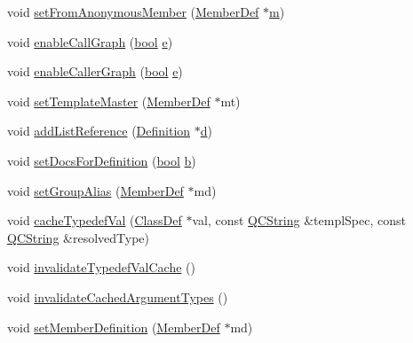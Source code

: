 \begin{DoxyCompactItemize}
\item 
void \hyperlink{class_member_def_aafa5f4cbcf4725cedc9ade6c18846454}{set\+From\+Anonymous\+Member} (\hyperlink{class_member_def}{Member\+Def} $\ast$\hyperlink{060__command__switch_8tcl_a78d127e8bda64d4471ac811ad512fbd9}{m})
\item 
void \hyperlink{class_member_def_ab47df482582383584ba4317a78b0f9a4}{enable\+Call\+Graph} (\hyperlink{qglobal_8h_a1062901a7428fdd9c7f180f5e01ea056}{bool} \hyperlink{060__command__switch_8tcl_aff65a51a703804e0ad1adbcfd76c86f8}{e})
\item 
void \hyperlink{class_member_def_a2636eed17da2f4fbb5e21e539429057c}{enable\+Caller\+Graph} (\hyperlink{qglobal_8h_a1062901a7428fdd9c7f180f5e01ea056}{bool} \hyperlink{060__command__switch_8tcl_aff65a51a703804e0ad1adbcfd76c86f8}{e})
\item 
void \hyperlink{class_member_def_a329e8f937a85c720897c571c48eec2eb}{set\+Template\+Master} (\hyperlink{class_member_def}{Member\+Def} $\ast$mt)
\item 
void \hyperlink{class_member_def_a6e41c3e69f5dbd82a5f52e384993b4a3}{add\+List\+Reference} (\hyperlink{class_definition}{Definition} $\ast$\hyperlink{060__command__switch_8tcl_af43f4b1f0064a33b2d662af9f06d3a00}{d})
\item 
void \hyperlink{class_member_def_a6af8024c45cb6bf279dec24f9be43ff7}{set\+Docs\+For\+Definition} (\hyperlink{qglobal_8h_a1062901a7428fdd9c7f180f5e01ea056}{bool} \hyperlink{060__command__switch_8tcl_a68bdb74c144118d936931c46f75d4b3e}{b})
\item 
void \hyperlink{class_member_def_ac3303d13571e2eaf0c19e2d86d101ef2}{set\+Group\+Alias} (\hyperlink{class_member_def}{Member\+Def} $\ast$md)
\item 
void \hyperlink{class_member_def_a828b5a44411f89b7cad45a1f20ff1bd7}{cache\+Typedef\+Val} (\hyperlink{class_class_def}{Class\+Def} $\ast$val, const \hyperlink{class_q_c_string}{Q\+C\+String} \&templ\+Spec, const \hyperlink{class_q_c_string}{Q\+C\+String} \&resolved\+Type)
\item 
void \hyperlink{class_member_def_a9dbccfff3e6e5f29d892c351641e0c3e}{invalidate\+Typedef\+Val\+Cache} ()
\item 
void \hyperlink{class_member_def_a52975bd460c0417b348eee2f569e8230}{invalidate\+Cached\+Argument\+Types} ()
\item 
void \hyperlink{class_member_def_abe245c356b9476451713c813578c7087}{set\+Member\+Definition} (\hyperlink{class_member_def}{Member\+Def} $\ast$md)
\item 

\end{DoxyCompactItemize}
